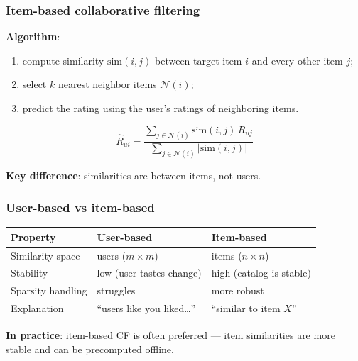 \documentclass[]{beamer}
\begin{document}
\begin{frame}[fragile]
\frametitle{Item-based collaborative filtering}
\textbf{Algorithm}:
\begin{enumerate}
  \item compute similarity $\mathrm{sim}(i, j)$ between target item $i$ and every other item $j$;
  \item select $k$ nearest neighbor items $\mathcal{N}(i)$;
  \item predict the rating using the user's ratings of neighboring items.
\end{enumerate}

\begin{equation*}
\hat{R}_{ui} = \frac{\displaystyle\sum_{j \in \mathcal{N}(i)} \mathrm{sim}(i, j)\,R_{uj}}
                    {\displaystyle\sum_{j \in \mathcal{N}(i)} |\mathrm{sim}(i, j)|}
\end{equation*}

\textbf{Key difference}: similarities are between items, not users.

\end{frame}

\begin{frame}[fragile]
\frametitle{User-based vs item-based}
\begin{center}
\begin{tabular}{lll}
\toprule
\textbf{Property} & \textbf{User-based} & \textbf{Item-based} \\
\midrule
Similarity space  & users ($m \times m$)   & items ($n \times n$) \\
Stability         & low (user tastes change) & high (catalog is stable) \\
Sparsity handling & struggles              & more robust \\
Explanation       & ``users like you liked\dots'' & ``similar to item $X$'' \\
\bottomrule
\end{tabular}
\end{center}

\vspace{3mm}
\textbf{In practice}: item-based CF is often preferred --- item similarities are more stable and can be precomputed offline.

\end{frame}
\end{document}
